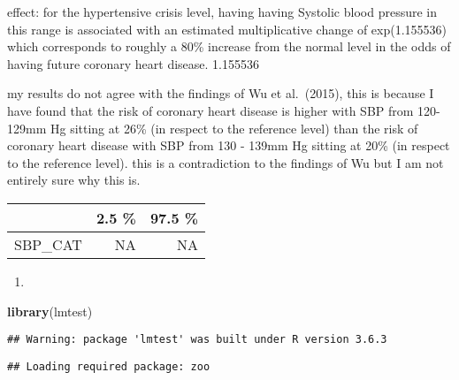 \documentclass[]{article}
\newenvironment{Shaded}{\begin{snugshade}}{\end{snugshade}}
\newcommand{\DataTypeTok}[1]{\textcolor[rgb]{0.13,0.29,0.53}{#1}}
\newcommand{\DecValTok}[1]{\textcolor[rgb]{0.00,0.00,0.81}{#1}}
\newcommand{\KeywordTok}[1]{\textcolor[rgb]{0.13,0.29,0.53}{\textbf{#1}}}
\newcommand{\NormalTok}[1]{#1}
\newcommand{\OperatorTok}[1]{\textcolor[rgb]{0.81,0.36,0.00}{\textbf{#1}}}
\newcommand{\StringTok}[1]{\textcolor[rgb]{0.31,0.60,0.02}{#1}}
\begin{document}
effect: for the hypertensive crisis level, having having Systolic blood
pressure in this range is associated with an estimated multiplicative
change of exp(1.155536) which corresponds to roughly a 80\% increase
from the normal level in the odds of having future coronary heart
disease. 1.155536

my results do not agree with the findings of Wu et al.~(2015), this is
because I have found that the risk of coronary heart disease is higher
with SBP from 120-129mm Hg sitting at 26\% (in respect to the reference
level) than the risk of coronary heart disease with SBP from 130 - 139mm
Hg sitting at 20\% (in respect to the reference level). this is a
contradiction to the findings of Wu but I am not entirely sure why this
is.

\begin{Shaded}
\end{Shaded}

\begin{table}[H]
\centering
\begin{tabular}{l|r|r}
\hline
  & 2.5 \% & 97.5 \%\\
\hline
SBP\_CAT & NA & NA\\
\hline
\end{tabular}
\end{table}

\begin{enumerate}
\def\labelenumi{\alph{enumi})}
\setcounter{enumi}{5}
\item
\end{enumerate}

\begin{Shaded}
\begin{Highlighting}[]
\KeywordTok{library}\NormalTok{(lmtest)}
\end{Highlighting}
\end{Shaded}

\begin{verbatim}
## Warning: package 'lmtest' was built under R version 3.6.3
\end{verbatim}

\begin{verbatim}
## Loading required package: zoo
\end{verbatim}
\end{document}
